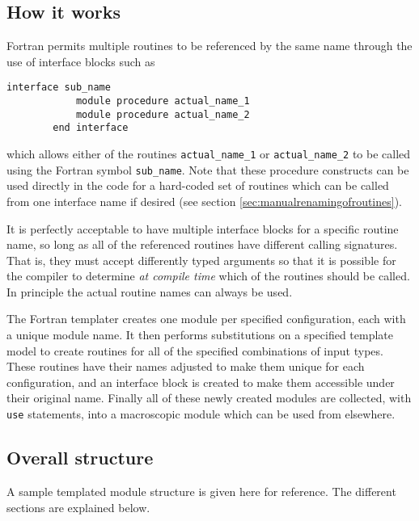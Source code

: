 \documentclass[a4paper,notitlepage]{scrreprt}
\let\code\lstinline
\begin{document}
\subsection{How it works}
	Fortran permits multiple routines to be referenced by the same name through
	the use of interface blocks such as
	\begin{lstlisting}[gobble=4]
		interface sub_name
			module procedure actual_name_1
			module procedure actual_name_2
		end interface
	\end{lstlisting}
	which allows either of the routines \code{actual_name_1} or
	\code{actual_name_2} to be called using the Fortran symbol
	\code{sub_name}. Note that these procedure constructs can be used directly in the code
	for a hard-coded set of routines which can be called from one interface name if desired (see section \ref{sec:manualrenamingofroutines}).

	It is perfectly acceptable to have multiple interface blocks for a specific
	routine name, so long as all of the referenced routines have different
	calling signatures. That is, they must accept differently typed arguments
	so that it is possible for the compiler to determine \emph{at compile time}
	which of the routines should be called. In principle the actual routine
	names can always be used.

	The Fortran templater creates one module per specified configuration,
	each with a unique module name. It then performs substitutions on a
	specified template model to create routines for all of the specified
	combinations of input types. These routines have their names adjusted to
	make them unique for each configuration, and an interface block is created
	to make them accessible under their original name. Finally all of these
	newly created modules are collected, with \code{use} statements, into
	a macroscopic module which can be used from elsewhere.

\subsection{Overall structure}
	A sample templated module structure is given here for reference. The
	different sections are explained below.
\end{document}
